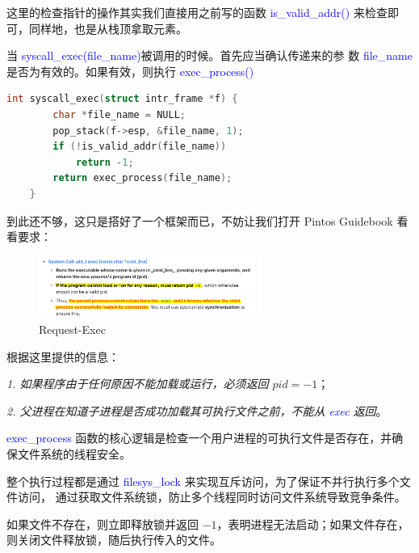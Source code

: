 \documentclass[14pt,a4paper,UTF8,twoside]{article}
\renewcommand{\texttt}[1]{\textcolor{blue}{\ttfamily #1}}
\begin{document}
\begin{cth}

这里的检查指针的操作其实我们直接用之前写的函数 \texttt{is\_valid\_addr()} 来检查即可，同样地，也是从栈顶拿取元素。

当 \texttt{syscall\_exec(file\_name)}被调用的时候。首先应当确认传递来的参
数 \texttt{file\_name} 是否为有效的。如果有效，则执行 \texttt{exec\_process()}

\end{cth}

\begin{lstlisting}[language=C, title= syscall\_exec()]
    int syscall_exec(struct intr_frame *f) {
        char *file_name = NULL;
        pop_stack(f->esp, &file_name, 1);
        if (!is_valid_addr(file_name))
            return -1;
        return exec_process(file_name);
    }
\end{lstlisting}

到此还不够，这只是搭好了一个框架而已，不妨让我们打开 Pintos Guidebook 看看要求：

\begin{figure}[H]
    \centering
    \includegraphics[width=0.65\textwidth]{img6/exec_request.png}
    \caption{Request-Exec}
\end{figure}

根据这里提供的信息：

\begin{mdframed}[backgroundcolor=gray!10, linewidth=0.5pt, roundcorner=5pt]
    
    \textit{1. 如果程序由于任何原因不能加载或运行，必须返回 $pid = -1$}；

    \textit{2. 父进程在知道子进程是否成功加载其可执行文件之前，不能从 \texttt{exec} 返回}。
\end{mdframed}

\begin{cth}
    \texttt{exec\_process} 函数的核心逻辑是检查一个用户进程的可执行文件是否存在，并确保文件系统的线程安全。

    \vspace{0.2cm}

    整个执行过程都是通过 \texttt{filesys\_lock} 来实现互斥访问，为了保证不并行执行多个文件访问，
    通过获取文件系统锁，防止多个线程同时访问文件系统导致竞争条件。

    \vspace{0.2cm}

    如果文件不存在，则立即释放锁并返回 $-1$，表明进程无法启动；如果文件存在，则关闭文件释放锁，随后执行传入的文件。
\end{cth}
\end{document}
